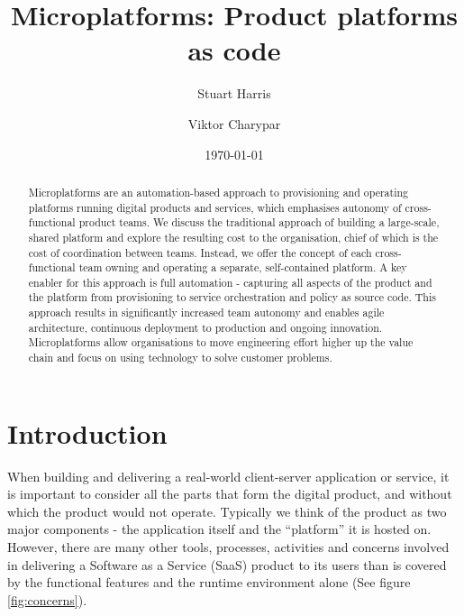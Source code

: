 \documentclass[reprint,amsmath,amssymb,aps]{revtex4-1}
\begin{document}

\title{Microplatforms: Product platforms as code}%

\author{Stuart Harris}
\author{Viktor Charypar}

\date{\today}

\begin{abstract}
	Microplatforms are an automation-based approach to provisioning and operating platforms running digital products and services, which emphasises autonomy of cross-functional product teams. We discuss the traditional approach of building a large-scale, shared platform and explore the resulting cost to the organisation, chief of which is the cost of coordination between teams. Instead, we offer the concept of each cross-functional team owning and operating a separate, self-contained platform. A key enabler for this approach is full automation - capturing all aspects of the product and the platform from provisioning to service orchestration and policy as source code. This approach results in significantly increased team autonomy and enables agile architecture, continuous deployment to production and ongoing innovation. Microplatforms allow organisations to move engineering effort higher up the value chain and focus on using technology to solve customer problems.
\end{abstract}

\maketitle


\section*{Introduction}
\label{sec:introduction}

When building and delivering a real-world client-server application or service, it is important to consider all the parts that form the digital product, and without which the product would not operate. Typically we think of the product as two major components - the application itself and the ``platform'' it is hosted on. However, there are many other tools, processes, activities and concerns involved in delivering a Software as a Service (SaaS) product to its users than is covered by the functional features and the runtime environment alone (See figure \ref{fig:concerns}).
\end{document}
